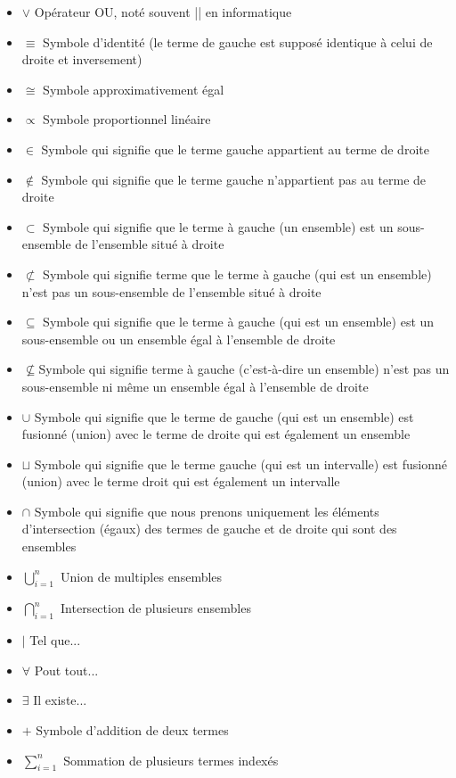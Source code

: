 \begin{itemize}[label={},leftmargin=0.5cm]
	 	\item $\vee$ Opérateur OU, noté souvent || en informatique
	 	\item $\equiv$ Symbole d'identité (le terme de gauche est supposé identique à celui de droite et inversement)
	 	\item $\cong$ Symbole approximativement égal
	 	\item $\propto$ Symbole proportionnel linéaire
	 	\item $\in$ Symbole qui signifie que le terme gauche appartient au terme de droite
	 	\item $\not\in$ Symbole qui signifie que le terme gauche n’appartient pas au terme de droite
	 	\item $\subset$ Symbole qui signifie que le terme à gauche (un ensemble) est un sous-ensemble de l’ensemble situé à droite
	 	\item $\not\subset$ Symbole qui signifie terme que le terme à gauche (qui est un ensemble) n’est pas un sous-ensemble de l’ensemble situé à droite
	 	\item $\subseteq$ Symbole qui signifie que le terme à gauche (qui est un ensemble) est un sous-ensemble ou un ensemble égal à l'ensemble de droite
	 	\item $\not\subseteq$Symbole qui signifie terme à gauche (c'est-à-dire un ensemble) n'est pas un sous-ensemble ni même un ensemble égal à l'ensemble de droite
	 	\item $\cup$ Symbole qui signifie que le terme de gauche (qui est un ensemble) est fusionné (union) avec le terme de droite qui est également un ensemble
	 	\item $\sqcup$ Symbole qui signifie que le terme gauche (qui est un intervalle) est fusionné (union) avec le terme droit qui est également un intervalle
	 	\item $\cap$ Symbole qui signifie que nous prenons uniquement les éléments d'intersection (égaux) des termes de gauche et de droite qui sont des ensembles
	 	\item $\displaystyle \bigcup_{i=1}^n$ Union de multiples ensembles
	 	\item $\displaystyle \bigcap_{i=1}^n$ Intersection de plusieurs ensembles
	 	\item $\mid$ Tel que...
	 	\item $\forall$ Pout tout...
	 	\item $\exists$ Il existe...
	 	\item $+$ Symbole d'addition de deux termes
	 	\item $\displaystyle \sum_{i=1}^n$ Sommation de plusieurs termes indexés

\end{itemize}
